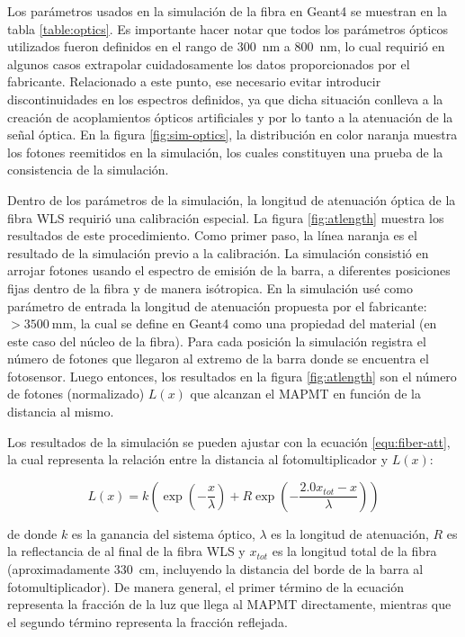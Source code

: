 \begin{table}
\begin{tabular}{lr}
\end{tabular}
\end{table}

Los parámetros usados en la simulación de la fibra en Geant4 se muestran en la tabla \ref{table:optics}. Es importante hacer notar que todos los parámetros ópticos utilizados fueron definidos en el rango de \SI{300}{\nano\metre} a \SI{800}{\nano\metre}, lo cual requirió en algunos casos extrapolar cuidadosamente los datos proporcionados por el fabricante. Relacionado a este punto, ese necesario evitar introducir discontinuidades en los espectros definidos, ya que dicha situación conlleva a la creación de acoplamientos ópticos artificiales y por lo tanto a la atenuación de la señal óptica. En la figura \ref{fig:sim-optics}, la distribución en color naranja muestra los fotones reemitidos en la simulación, los cuales constituyen una prueba de la consistencia de la simulación.

Dentro de los parámetros de la simulación, la longitud de atenuación óptica de la fibra WLS requirió una calibración especial. La figura \ref{fig:atlength} muestra los resultados de este procedimiento. Como primer paso, la línea naranja es el resultado de la simulación previo a la calibración. La simulación consistió en arrojar fotones usando el espectro de emisión de la barra, a diferentes posiciones fijas dentro de la fibra y de manera isótropica. En la simulación usé como parámetro de entrada la longitud de atenuación propuesta por el fabricante: $>\SI{3500}{\milli\metre}$, la cual se define en Geant4 como una propiedad del material (en este caso del núcleo de la fibra). Para cada posición la simulación registra el número de fotones que llegaron al extremo de la barra donde se encuentra el fotosensor. Luego entonces, los resultados en la figura \ref{fig:atlength} son el número de fotones (normalizado) $L(x)$ que alcanzan el MAPMT en función de la distancia al mismo.

Los resultados de la simulación se pueden ajustar con la ecuación \ref{equ:fiber-att}, la cual representa la relación entre la distancia al fotomultiplicador y $L(x)$:

\begin{equation}
\label{equ:fiber-att}
L(x)=k\left(\exp\left(-\frac{x}{\lambda}\right) +R\exp\left(-\frac{2.0x_{tot}-x}{\lambda}\right)\right)
\end{equation}

de donde $k$ es la ganancia del sistema óptico, $\lambda$ es la longitud de atenuación, $R$ es la reflectancia de al final de la fibra WLS y $x_{tot}$ es la longitud total de la fibra (aproximadamente \SI{330}{\cm}, incluyendo la distancia del borde de la barra al fotomultiplicador). De manera general, el primer término de la ecuación representa la fracción de la luz que llega al MAPMT directamente, mientras que el segundo término representa la fracción reflejada.

